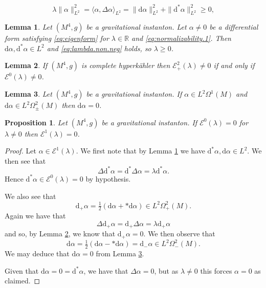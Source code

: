 \documentclass[10pt,a4paper]{amsart}
\newtheorem{lem}{Lemma}
\newtheorem{prop}{Proposition}
\def\R{\mathbb{R}}
\def\d{\mathrm{d}}
\begin{document}
\begin{equation}\label{eq:lambda.non.neg}
\lambda\|\alpha\|_{L^2}^2=\langle \alpha,\Delta\alpha\rangle_{L^2}=\|\d\alpha\|_{L^2}^2+\|\d^*\alpha\|_{L^2}^2\geq 0,
\end{equation}

\begin{lem}\label{lem:integrability.grav.inst}  Let $(M^4,g)$ be a gravitational instanton.  
   Let $\alpha\neq 0$ be a differential form satisfying \eqref{eq:eigenform} for $\lambda\in\R$ and \eqref{eq:normalizability.1}.  Then $\d\alpha,\d^*\alpha\in L^2$ and \eqref{eq:lambda.non.neg} holds, so $\lambda\geq 0$.
\end{lem}

\begin{lem}\label{lem:hk.ALE.sd}   
If $(M^4,g)$ is complete hyperk\"ahler then $\mathcal{E}^2_+(\lambda)\neq 0$ if and only if $\mathcal{E}^0(\lambda)\neq 0$.
\end{lem}

\begin{lem}\label{lem:hk.asd.exact}  Let $(M^4,g)$ be a gravitational instanton.  
If $\alpha\in L^2\Omega^1(M)$ and $\d\alpha\in L^2\Omega^2_{\pm}(M)$ then $\d\alpha=0$.
\end{lem}

\begin{prop}\label{prop:hk.ALE.1forms} Let $(M^4,g)$ be a gravitational instanton.  If $\mathcal{E}^0(\lambda)=0$ for $\lambda\neq 0$ then $\mathcal{E}^1(\lambda)=0$.
\end{prop}

\begin{proof}  Let $\alpha\in \mathcal{E}^1(\lambda)$.  
 We first note that by Lemma \ref{lem:integrability.grav.inst} we have $\d^*\alpha,\d\alpha\in L^2$.  We then see that
 \begin{equation}\label{eq:Delta.d*}
      \Delta \d^*\alpha=\d^*\Delta\alpha=\lambda\d^*\alpha.
 \end{equation}
 Hence $\d^*\alpha\in \mathcal{E}^0(\lambda)=0$ by hypothesis.
 
 
 We also see that 
\begin{equation}
     \d_+\alpha=\tfrac{1}{2}(\d\alpha+*\d\alpha)\in L^2\Omega^2_+(M).
\end{equation}
 Again we have that
\begin{equation}
    \Delta \d_+\alpha=\d_+\Delta\alpha=\lambda\d_+\alpha
\end{equation}
and so, by Lemma \ref{lem:hk.ALE.sd}, we know that $\d_+\alpha=0$. We then observe that
\begin{equation}
    \d\alpha=\tfrac{1}{2}(\d\alpha-*\d\alpha)=\d_-\alpha\in L^2\Omega^2_-(M).
\end{equation}
We may deduce that $\d\alpha=0$ from Lemma \ref{lem:hk.asd.exact}.

Given that $\d\alpha=0=\d^*\alpha$, we have that $\Delta\alpha=0$, but as $\lambda\neq 0$ this forces $\alpha=0$ as claimed.
\end{proof}
\end{document}
